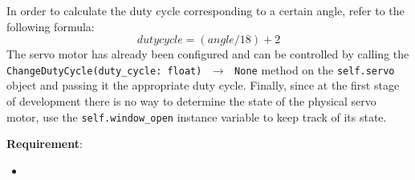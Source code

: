 In order to calculate the duty cycle corresponding to a certain angle, refer to the following formula:
\[
    duty cycle = (angle / 18) + 2
\]
The servo motor has already been configured and can be controlled by calling the \texttt{ChangeDutyCycle(duty\_cycle: float) $\,\to\,$ None} method on the \texttt{self.servo} object and passing it the appropriate duty cycle.
Finally, since at the first stage of development there is no way to determine the state of the physical servo motor, use the \texttt{self.window\_open} instance variable to keep track of its state.

\noindent\textbf{Requirement}:
\begin{itemize}
    \item 
\end{itemize}
